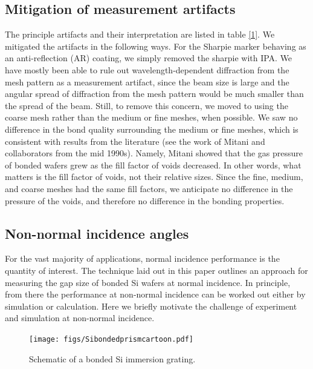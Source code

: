 \documentclass[osajnl,preprint,showpacs,superscriptaddress,12pt]{revtex4-1} %
\begin{document}
\subsection{Mitigation of measurement artifacts}
The principle artifacts and their interpretation are listed in table \ref{1}.  We mitigated the artifacts in the following ways.  For the Sharpie marker behaving as an anti-reflection (AR) coating, we simply removed the sharpie with IPA.  We have mostly been able to rule out wavelength-dependent diffraction from the mesh pattern as a measurement artifact, since the beam size is large and the angular spread of diffraction from the mesh pattern would be much smaller than the spread of the beam.  Still, to remove this concern, we moved to using the coarse mesh rather than the medium or fine meshes, when possible.  We saw no difference in the bond quality surrounding the medium or fine meshes, which is consistent with results from the literature (see the work of Mitani and collaborators from the mid 1990s).  Namely, Mitani showed that the gas pressure of bonded wafers grew as the fill factor of voids decreased.  In other words, what matters is the fill factor of voids, not their relative sizes.  Since the fine, medium, and coarse meshes had the same fill factors, we anticipate no difference in the pressure of the voids, and therefore no difference in the bonding properties.

\subsection{Non-normal incidence angles}
For the vast majority of applications, normal incidence performance is the quantity of interest.  The technique laid out in this paper outlines an approach for measuring the gap size of bonded Si wafers at normal incidence.  In principle, from there the performance at non-normal incidence can be worked out either by simulation or calculation.  Here we briefly motivate the challenge of experiment and simulation at non-normal incidence.  

\begin{figure}[htbp]
\centerline{\texttt{[image: figs/Sibondedprismcartoon.pdf]}}
\caption{Schematic of a bonded Si immersion grating\label{figSiPrism}.  }
\end{figure}
\end{document}

